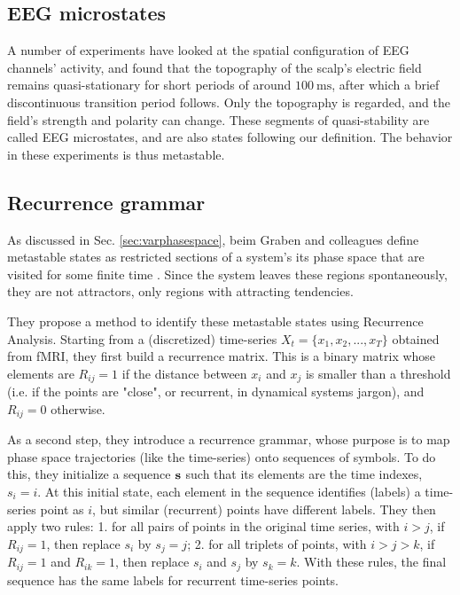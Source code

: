 \documentclass[preprint,superscriptaddress,showpacs,amsmath,amssymb,aps,pre,floatfix]{revtex4-1}
\theoremstyle{definition}
\begin{document}
\subsection{EEG microstates}
A number of experiments \cite{lehmann_1987, vandeville_2010} have looked at the spatial configuration of EEG channels' activity, and found that the topography of the scalp's electric field remains quasi-stationary for short periods of around $\SI{100}{\milli\second}$, after which a brief discontinuous transition period follows. Only the topography is regarded, and the field's strength and polarity can change. 
These segments of quasi-stability are called EEG microstates, and are also states following our definition. The behavior in these experiments is thus metastable. 



\subsection{Recurrence grammar}
As discussed in Sec. \ref{sec:varphasespace}, beim Graben and colleagues define metastable states as restricted sections of a system's its phase space that are visited for some finite time \cite{beimgraben_2019}. Since the system leaves these regions spontaneously, they are not attractors, only regions with attracting tendencies.  

They propose a method to identify these metastable states using Recurrence Analysis. Starting from a (discretized) time-series $X_t = \{x_1, x_2, ..., x_T\}$ obtained from fMRI, they first build a recurrence matrix. This is a binary matrix whose elements are $R_{ij} = 1$ if the distance between $x_i$ and $x_j$ is smaller than a threshold (i.e. if the points are "close", or recurrent, in dynamical systems jargon), and $R_{ij} = 0$ otherwise.

As a second step, they introduce a recurrence grammar, whose purpose is to map phase space trajectories (like the time-series) onto sequences of symbols. To do this, they initialize a sequence $\bf{s}$ such that its elements are the time indexes, $s_i = i$. At this initial state, each element in the sequence identifies (labels) a time-series point as $i$, but similar (recurrent) points have different labels.  They then apply two rules: 1. for all pairs of points in the original time series, with $i > j$, if $R_{ij} = 1$, then replace $s_i$ by $s_j = j$; 2. for all triplets of points, with $i > j > k$, if $R_{ij} = 1$ and $R_{ik} = 1$, then replace $s_i$ and $s_j$ by $s_k = k$.
With these rules, the final sequence has the same labels for recurrent time-series points. 
\end{document}
